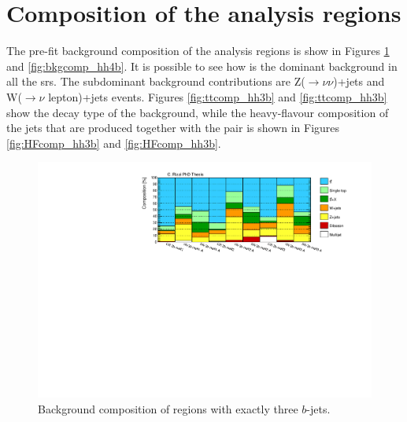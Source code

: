 \section{Composition of the analysis regions}

The pre-fit background composition of the analysis regions is show in Figures \ref{fig:bkgcomp_hh3b} and \ref{fig:bkgcomp_hh4b}.
It is possible to see how \ttbar is the dominant background in all the \glspl{sr}.
The subdominant background contributions are Z($\to \nu \nu$)+jets and W($\to \nu$ lepton)+jets events.
Figures \ref{fig:ttcomp_hh3b} and \ref{fig:ttcomp_hh3b} show the decay type of the \ttbar background,
while the heavy-flavour composition of the jets that are produced together with the \ttbar pair is shown 
in Figures \ref{fig:HFcomp_hh3b} and \ref{fig:HFcomp_hh3b}.

\begin{figure}[htbp]
\includegraphics[width=\textwidth]{figures/ewk_prod/comp_plots/hh_3b_bkg.pdf}
\caption{Background composition of regions with exactly three $b$-jets.}
	\label{fig:bkgcomp_hh3b}
\end{figure}

